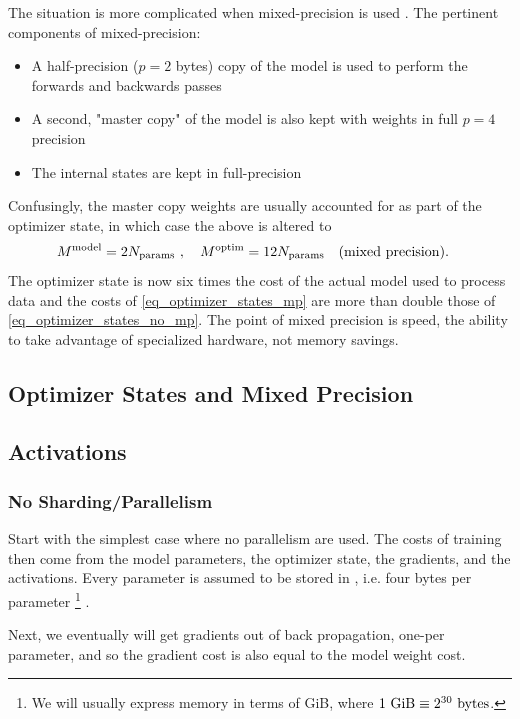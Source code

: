 \documentclass[11pt]{article}
\begin{document}
The situation is more complicated when mixed-precision is used \cite{micikevicius2018mixed}.
The pertinent components of mixed-precision:
\begin{itemize}
\item A half-precision ($ p=2 $ bytes) copy of the model is used to perform the forwards and
    backwards passes
\item A second, "master copy" of the model is also kept with weights in full $ p=4 $ precision
\item The internal  states are kept in full-precision
\end{itemize}
Confusingly, the master copy weights are usually accounted for as part of the optimizer state, in
which case the above is altered to
\begin{align}
    M ^{ \rm model} &= 2 N _{ \rm params } \ , \quad M^{ \rm  optim } = 12 N _{ \rm params }
    \quad ({\rm mixed \ precision}) .
    \label{eq_optimizer_states_mp}
\end{align}
The optimizer state is now six times the cost of the actual model used to process data and the costs
of \eqref{eq_optimizer_states_mp} are more than double those of \eqref{eq_optimizer_states_no_mp}.
The point of mixed precision is speed, the ability to take advantage of specialized hardware, not
memory savings.


\subsection{Optimizer States and Mixed Precision}




\subsection{Activations}


\subsubsection{No Sharding/Parallelism}

Start with the simplest case where no parallelism are
used.  The costs of training then come from the model parameters, the optimizer state, the
gradients, and the activations. Every parameter is assumed to be stored in , i.e.
four bytes per parameter \footnote{We will usually express memory in terms of GiB, where $ 1\ {\rm
GiB}\equiv 2 ^{ 30 }\ {\rm bytes}  $.} .


Next, we eventually will get gradients out of back propagation, one-per parameter, and so the
gradient cost is also equal to the model weight cost.
\end{document}
